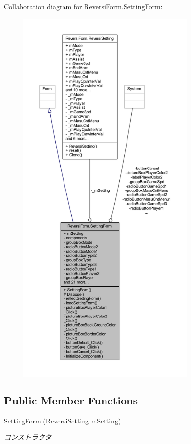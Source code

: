 Collaboration diagram for Reversi\+Form.\+Setting\+Form\+:
\nopagebreak
\begin{figure}[H]
\begin{center}
\leavevmode
\includegraphics[height=550pt]{class_reversi_form_1_1_setting_form__coll__graph}
\end{center}
\end{figure}
\subsection*{Public Member Functions}
\begin{DoxyCompactItemize}
\item 
\hyperlink{class_reversi_form_1_1_setting_form_ac0583da0aa8221e0851b147271361ca8}{Setting\+Form} (\hyperlink{class_reversi_form_1_1_reversi_setting}{Reversi\+Setting} m\+Setting)
\begin{DoxyCompactList}\small\item\em コンストラクタ \end{DoxyCompactList}\end{DoxyCompactItemize}
